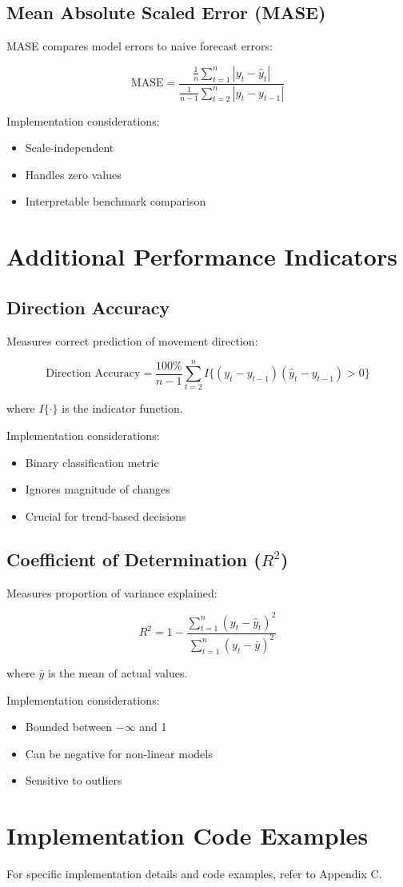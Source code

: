 \documentclass[12pt,a4paper]{report}
\begin{document}
\subsection{Mean Absolute Scaled Error (MASE)}
MASE compares model errors to naive forecast errors:

\[
\text{MASE} = \frac{\frac{1}{n}\sum_{t=1}^{n}|y_t - \hat{y}_t|}{\frac{1}{n-1}\sum_{t=2}^{n}|y_t - y_{t-1}|}
\]

Implementation considerations:
\begin{itemize}
    \item Scale-independent
    \item Handles zero values
    \item Interpretable benchmark comparison
\end{itemize}

\section{Additional Performance Indicators}

\subsection{Direction Accuracy}
Measures correct prediction of movement direction:

\[
\text{Direction Accuracy} = \frac{100\%}{n-1} \sum_{t=2}^{n} I\{(y_t - y_{t-1})(\hat{y}_t - y_{t-1}) > 0\}
\]

where \(I\{\cdot\}\) is the indicator function.

Implementation considerations:
\begin{itemize}
    \item Binary classification metric
    \item Ignores magnitude of changes
    \item Crucial for trend-based decisions
\end{itemize}

\subsection{Coefficient of Determination (\(R^2\))}
Measures proportion of variance explained:

\[
R^2 = 1 - \frac{\sum_{t=1}^{n}(y_t - \hat{y}_t)^2}{\sum_{t=1}^{n}(y_t - \bar{y})^2}
\]

where \(\bar{y}\) is the mean of actual values.

Implementation considerations:
\begin{itemize}
    \item Bounded between \(-\infty\) and 1
    \item Can be negative for non-linear models
    \item Sensitive to outliers
\end{itemize}

\section{Implementation Code Examples}
For specific implementation details and code examples, refer to Appendix C.
\end{document}
